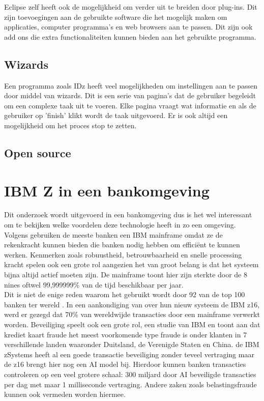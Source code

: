 Eclipse zelf heeft ook de mogelijkheid om verder uit te breiden door plug-ins. Dit zijn toevoegingen aan de gebruikte software die het mogelijk maken om applicaties, computer programma's en web browsers aan te passen. Dit zijn ook add ons die extra functionaliteiten kunnen bieden aan het gebruikte programma. \autocite{George2021}

\subsection{Wizards}
Een programma zoals IDz heeft veel mogelijkheden om instellingen aan te passen door middel van wizards. Dit is een serie van pagina's dat de gebruiker begeleidt om een complexe taak uit te voeren. Elke pagina vraagt wat informatie en als de gebruiker op 'finish' klikt wordt de taak uitgevoerd. Er is ook altijd een mogelijkheid om het proces stop te zetten.\autocite{Eclipse2006}

\subsection{Open source}


\section{IBM Z in een bankomgeving}
Dit onderzoek wordt uitgevoerd in een bankomgeving dus is het wel interessant om te bekijken welke voordelen deze technologie heeft in zo een omgeving. \\ 
Volgens \textcite{Turner2022} gebruiken de meeste banken een IBM mainframe omdat ze de rekenkracht kunnen bieden die banken nodig hebben om efficiënt te kunnen werken. Kenmerken zoals robuustheid, betrouwbaarheid en snelle processing kracht spelen ook een grote rol aangezien het van groot belang is dat het systeem bijna altijd actief moeten zijn. De mainframe toont hier zijn sterkte door de 8 nines oftwel 99,999999\% van de tijd beschikbaar per jaar. \autocite{IBMa} \\

Dit is niet de enige reden waarom het gebruikt wordt door 92 van de top 100 banken ter wereld \autocite{Tozzi2022}. In een aankondiging van \textcite{IBM2022} over hun nieuw systeem de IBM z16, werd er gezegd dat 70\% van wereldwijde transacties door een mainframe verwerkt worden. Beveiliging speelt ook een grote rol, een studie van IBM en \textcite{MorningConsult2022} toont aan dat krediet kaart fraude het meest voorkomende type fraude is onder klanten in 7 verschillende landen waaronder Duitsland, de Verenigde Staten en China. de IBM zSystems heeft al een goede transactie beveiliging zonder teveel vertraging maar de z16 brengt hier nog een AI model bij. Hierdoor kunnen banken transacties controleren op een veel grotere schaal: 300 miljard door AI beveiligde transacties per dag met maar 1 milliseconde vertraging. Andere zaken zoals belastingsfraude kunnen ook vermeden worden hiermee. \autocite{IBM2022} \\

